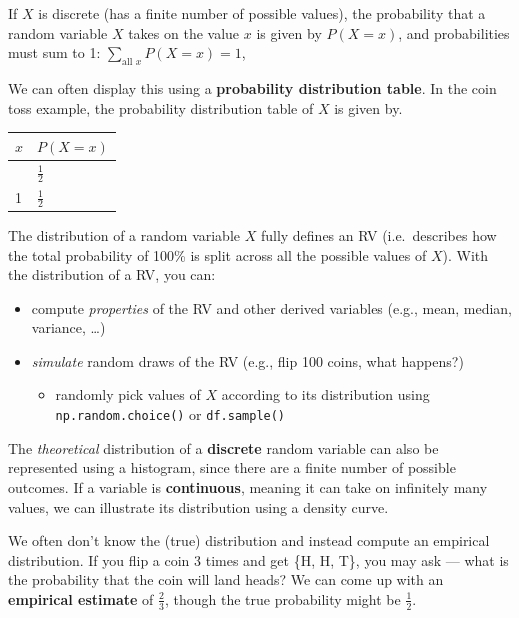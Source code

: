 \documentclass[
  letterpaper,
  DIV=11,
  numbers=noendperiod]{scrreprt}
\providecommand{\tightlist}{%
  \setlength{\itemsep}{0pt}\setlength{\parskip}{0pt}}\usepackage{longtable,booktabs,array}
\begin{document}
If \(X\) is discrete (has a finite number of possible values), the
probability that a random variable \(X\) takes on the value \(x\) is
given by \(P(X=x)\), and probabilities must sum to 1:
\(\underset{\text{all } x}{\sum} P(X=x) = 1\),

We can often display this using a \textbf{probability distribution
table}. In the coin toss example, the probability distribution table of
\(X\) is given by.

\begin{longtable}[]{@{}ll@{}}
\toprule\noalign{}
\(x\) & \(P(X=x)\) \\
\midrule\noalign{}
\endhead
\bottomrule\noalign{}
\endlastfoot
0 & \(\frac{1}{2}\) \\
1 & \(\frac{1}{2}\) \\
\end{longtable}

The distribution of a random variable \(X\) fully defines an RV
(i.e.~describes how the total probability of 100\% is split across all
the possible values of \(X\)). With the distribution of a RV, you can:

\begin{itemize}
\tightlist
\item
  compute \emph{properties} of the RV and other derived variables (e.g.,
  mean, median, variance, \ldots)
\item
  \emph{simulate} random draws of the RV (e.g., flip 100 coins, what
  happens?)

  \begin{itemize}
  \tightlist
  \item
    randomly pick values of \(X\) according to its distribution using
    \texttt{np.random.choice()} or \texttt{df.sample()}
  \end{itemize}
\end{itemize}

The \emph{theoretical} distribution of a \textbf{discrete} random
variable can also be represented using a histogram, since there are a
finite number of possible outcomes. If a variable is
\textbf{continuous}, meaning it can take on infinitely many values, we
can illustrate its distribution using a density curve.

We often don't know the (true) distribution and instead compute an
empirical distribution. If you flip a coin 3 times and get \{H, H, T\},
you may ask --- what is the probability that the coin will land heads?
We can come up with an \textbf{empirical estimate} of \(\frac{2}{3}\),
though the true probability might be \(\frac{1}{2}\).
\end{document}
